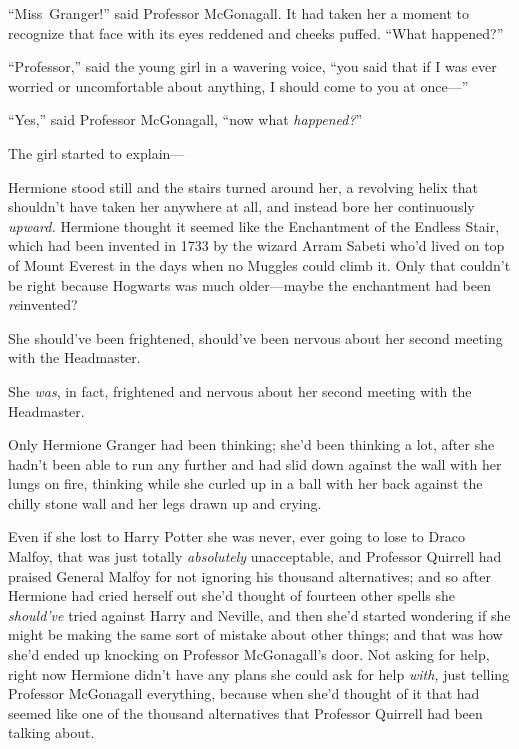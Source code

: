 “Miss~Granger!” said Professor McGonagall. It had taken her a moment to recognize that face with its eyes reddened and cheeks puffed. “What happened?”

“Professor,” said the young girl in a wavering voice, “you said that if I was ever worried or uncomfortable about anything, I should come to you at once—”

“Yes,” said Professor McGonagall, “now what \emph{happened?}”

The girl started to explain—

\later

Hermione stood still and the stairs turned around her, a revolving helix that shouldn’t have taken her anywhere at all, and instead bore her continuously \emph{upward.} Hermione thought it seemed like the Enchantment of the Endless Stair, which had been invented in 1733 by the wizard Arram Sabeti who’d lived on top of Mount Everest in the days when no Muggles could climb it. Only that couldn’t be right because Hogwarts was much older—maybe the enchantment had been \emph{re}invented?

She should’ve been frightened, should’ve been nervous about her second meeting with the Headmaster.

She \emph{was}, in fact, frightened and nervous about her second meeting with the Headmaster.

Only Hermione Granger had been thinking; she’d been thinking a lot, after she hadn’t been able to run any further and had slid down against the wall with her lungs on fire, thinking while she curled up in a ball with her back against the chilly stone wall and her legs drawn up and crying.

Even if she lost to Harry Potter she was never, ever going to lose to Draco Malfoy, that was just totally \emph{absolutely} unacceptable, and Professor Quirrell had praised General Malfoy for not ignoring his thousand alternatives; and so after Hermione had cried herself out she’d thought of fourteen other spells she \emph{should’ve} tried against Harry and Neville, and then she’d started wondering if she might be making the same sort of mistake about other things; and that was how she’d ended up knocking on Professor McGonagall’s door. Not asking for help, right now Hermione didn’t have any plans she could ask for help \emph{with,} just telling Professor McGonagall everything, because when she’d thought of it that had seemed like one of the thousand alternatives that Professor Quirrell had been talking about.

